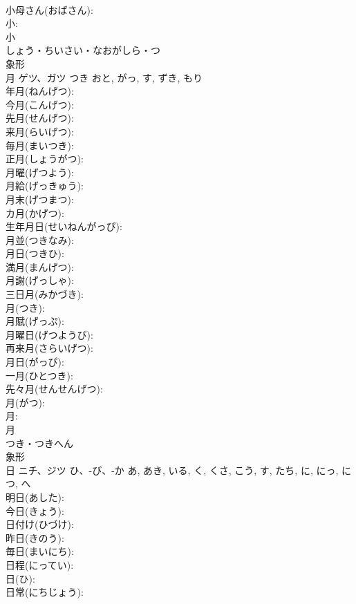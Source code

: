 \documentclass[8pt]{extreport}
\begin{document}
\begin{CJK}{UTF8}{min}
\\	小母さん(おばさん): 
\\	小: 
\\	小	
\\	しょう・ちいさい・なおがしら・つ	
\\	象形 
\\	月	ゲツ、ガツ	つき	おと, がっ, す, ずき, もり	
\\	年月(ねんげつ): 
\\	今月(こんげつ): 
\\	先月(せんげつ): 
\\	来月(らいげつ): 
\\	毎月(まいつき): 
\\	正月(しょうがつ): 
\\	月曜(げつよう): 
\\	月給(げっきゅう): 
\\	月末(げつまつ): 
\\	カ月(かげつ): 
\\	生年月日(せいねんがっぴ): 
\\	月並(つきなみ): 
\\	月日(つきひ): 
\\	満月(まんげつ): 
\\	月謝(げっしゃ): 
\\	三日月(みかづき): 
\\	月(つき): 
\\	月賦(げっぷ): 
\\	月曜日(げつようび): 
\\	再来月(さらいげつ): 
\\	月日(がっぴ): 
\\	一月(ひとつき): 
\\	先々月(せんせんげつ): 
\\	月(がつ): 
\\	月: 
\\	月	
\\	つき・つきへん	
\\	象形 
\\	日	ニチ、ジツ	ひ、-び、-か	あ, あき, いる, く, くさ, こう, す, たち, に, にっ, につ, へ	
\\	明日(あした): 
\\	今日(きょう): 
\\	日付け(ひづけ): 
\\	昨日(きのう): 
\\	毎日(まいにち): 
\\	日程(にってい): 
\\	日(ひ): 
\\	日常(にちじょう): 

\end{CJK}
\end{document}
